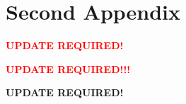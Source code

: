 \documentclass[doublespacing]{utdthesis}
\begin{document}
\chapter{Second Appendix}
\textcolor{red}{\textbf{UPDATE REQUIRED!}}


\begin{thesisbib}  %
  
\end{thesisbib}  %

\begin{biosketch}
  \textcolor{red}{\textbf{UPDATE REQUIRED!!!}}
\end{biosketch}


\begin{vita}  %
  \textbf{UPDATE REQUIRED!}
\end{vita}  %
\end{document}
